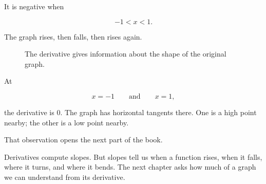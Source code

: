 It is negative when

\[
-1<x<1.
\]

The graph rises, then falls, then rises again.
\begin{figure}[h]
\centering
{}
\caption{The derivative gives information about the shape of the original graph.}
\label{fig:chapter-5-hook-derivative-shape}
\end{figure}

At

\[
x=-1
\qquad\text{and}\qquad
x=1,
\]

the derivative is \(0\).  The graph has horizontal tangents there.  One is a high point nearby; the other is a low point nearby.

That observation opens the next part of the book.

Derivatives compute slopes.  But slopes tell us when a function rises, when it falls, where it turns, and where it bends.  The next chapter asks how much of a graph we can understand from its derivative.